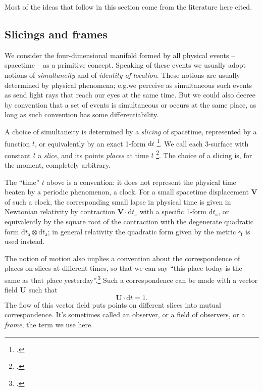 \documentclass[\ifafour a4paper,12pt,\else a5paper,10pt,\fi%
onecolumn,oneside,article,%
british%
]{memoir}
\theoremstyle{remark}
\theoremstyle{innote}
\newcommand*{\citep}{\footcites}
\newcommand*{\di}{\mathrm{d}}%
\renewcommand*{\|}[1][]{\nonscript\,#1\vert\nonscript\;\mathopen{}}
\newcommand*{\sect}{\S}%
\newcommand*{\eg}{{e.g.}}
\newcommand*{\yrr}{M}
\newcommand*{\yr}{\bm{\yrr}}
\newcommand*{\ytn}{t_{\textrm{a}}}
\newcommand*{\ycc}{u}
\newcommand*{\yc}{\bm{\ycc}}
\newcommand*{\yffg}{\gamma}
\newcommand*{\yfg}{\bm{\yffg}}
\newcommand*{\yFF}{U}
\newcommand*{\yF}{\bm{\yFF}}
\newcommand*{\ynn}{V}
\newcommand*{\yn}{\bm{\ynn}}
\begin{document}
Most of the ideas that follow in this section come from the literature here
cited.

\subsection{Slicings and frames}
\label{sec:slicing_frames}

We consider the four-dimensional manifold formed by all physical events --
spacetime -- as a primitive concept. Speaking of these events we usually
adopt notions of \emph{simultaneity} and of \emph{identity of location}.
These notions are usually determined by physical phenomena; \eg we perceive
as simultaneous such events as send light rays that reach our eyes at the
same time. But we could also decree by convention that a set of events is
simultaneous or occurs at the same place, as long as such convention has
some differentiability.

A choice of simultaneity is determined by a \emph{slicing} of spacetime,
represented by a function $t$, or equivalently by an exact 1-form $\di t$
\citep{york1979}. We call each 3-surface with constant $t$ a \emph{slice},
and its points \emph{places} at time $t$ \citep{smarretal1978,york1979,smarretal1980}[\sect~2.4]{marsdenetal1983b_r1994}. The choice of a slicing is, for
the moment, completely arbitrary.

The \enquote{time} $t$ above is a convention: it does not represent the
physical time beaten by a periodic phenomenon, a clock. For a small
spacetime displacement $\yn$ of such a clock, the corresponding small lapse
in physical time is given in Newtonian relativity by contraction
$\yn\cdot\di\ytn$ with a specific 1-form $\di\ytn$, or equivalently by the
square root of the contraction with the degenerate quadratic form
$\di\ytn \otimes \di\ytn$; in general relativity the quadratic form given
by the metric $\yfg$ is used instead.

The notion of motion also implies a convention about the correspondence of
places on slices at different times, so that we can say \enquote{this place
  today is the same as that place yesterday}.\citep[See the discussion
in][\sect~5]{portamana2011_r2019} Such a correspondence can be made with a
vector field $\yF$ such that
\begin{equation}
  \label{eq:observer_field_unit-time}
  \yF \cdot \di t = 1.
\end{equation}
The flow of this vector field puts points on different slices into mutual
correspondence. It's sometimes called an observer, or a field of observers,
or a \emph{frame}, the term we use here.
\end{document}
